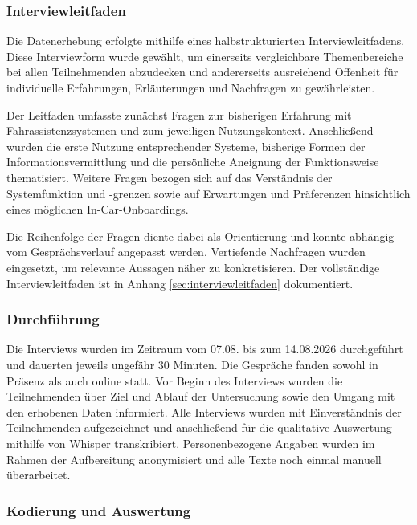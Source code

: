 \subsubsection{Interviewleitfaden}
\label{subsubsec:Interviewleitfaden}

Die Datenerhebung erfolgte mithilfe eines halbstrukturierten Interviewleitfadens. Diese Interviewform wurde gewählt, um einerseits vergleichbare Themenbereiche bei allen Teilnehmenden abzudecken und andererseits ausreichend Offenheit für individuelle Erfahrungen, Erläuterungen und Nachfragen zu gewährleisten.

Der Leitfaden umfasste zunächst Fragen zur bisherigen Erfahrung mit Fahrassistenzsystemen und zum jeweiligen Nutzungskontext. Anschließend wurden die erste Nutzung entsprechender Systeme, bisherige Formen der Informationsvermittlung und die persönliche Aneignung der Funktionsweise thematisiert. Weitere Fragen bezogen sich auf das Verständnis der Systemfunktion und -grenzen sowie auf Erwartungen und Präferenzen hinsichtlich eines möglichen In-Car-Onboardings.

Die Reihenfolge der Fragen diente dabei als Orientierung und konnte abhängig vom Gesprächsverlauf angepasst werden. Vertiefende Nachfragen wurden eingesetzt, um relevante Aussagen näher zu konkretisieren. Der vollständige Interviewleitfaden ist in Anhang \ref{sec:interviewleitfaden} dokumentiert.

\subsubsection{Durchführung}
\label{subsubsec:Durchführung}

Die Interviews wurden im Zeitraum vom 07.08. bis zum 14.08.2026 durchgeführt und dauerten jeweils ungefähr 30 Minuten. Die Gespräche fanden sowohl in Präsenz als auch online statt. Vor Beginn des Interviews wurden die Teilnehmenden über Ziel und Ablauf der Untersuchung sowie den Umgang mit den erhobenen Daten informiert.
Alle Interviews wurden mit Einverständnis der Teilnehmenden aufgezeichnet und anschließend für die qualitative Auswertung mithilfe von Whisper \cite{radford2022whisper} transkribiert. Personenbezogene Angaben wurden im Rahmen der Aufbereitung anonymisiert und alle Texte noch einmal manuell überarbeitet. 

\subsubsection{Kodierung und Auswertung}
\label{subsubsec:Kodierung_und_Auswertung}


